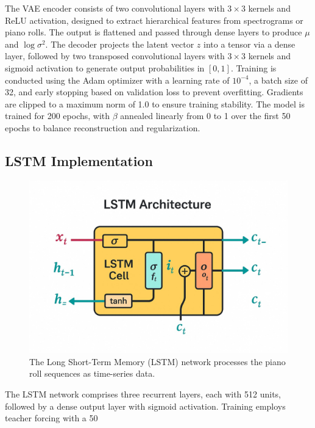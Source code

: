 \documentclass[conference]{IEEEtran}
\begin{document}
The VAE encoder consists of two convolutional layers with $3 \times 3$ kernels and ReLU activation, designed to extract hierarchical features from spectrograms or piano rolls. The output is flattened and passed through dense layers to produce $\mu$ and $\log\sigma^2$. The decoder projects the latent vector $z$ into a tensor via a dense layer, followed by two transposed convolutional layers with $3 \times 3$ kernels and sigmoid activation to generate output probabilities in $[0, 1]$. Training is conducted using the Adam optimizer with a learning rate of $10^{-4}$, a batch size of 32, and early stopping based on validation loss to prevent overfitting. Gradients are clipped to a maximum norm of 1.0 to ensure training stability. The model is trained for 200 epochs, with $\beta$ annealed linearly from 0 to 1 over the first 50 epochs to balance reconstruction and regularization.

\subsection{LSTM Implementation}
\begin{figure}[h]
    \centering
    \includegraphics[width=\linewidth]{LSTM.jpg}
    \caption{The Long Short-Term Memory (LSTM) network processes the piano roll sequences as time-series data.}
    \label{fig:lstm_arch}
\end{figure}

The LSTM network comprises three recurrent layers, each with 512 units, followed by a dense output layer with sigmoid activation. Training employs teacher forcing with a 50%
\end{document}
